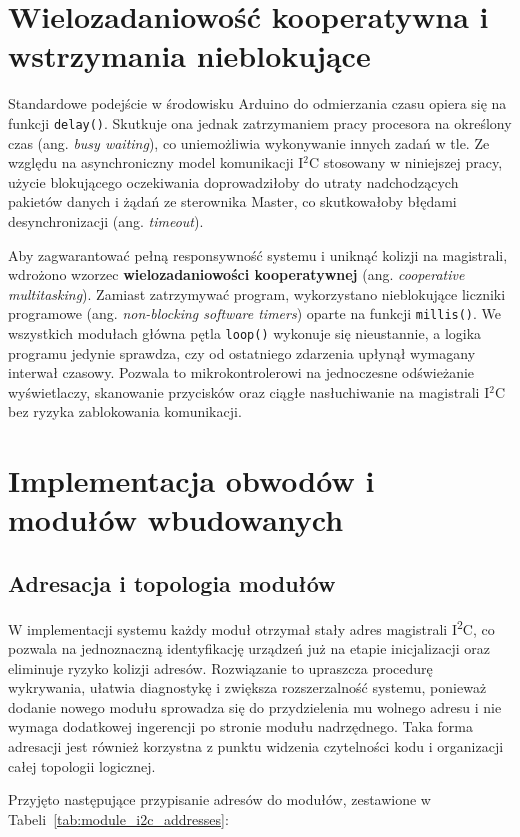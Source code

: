 \documentclass{SGGW-thesis}
\begin{document}
\section{Wielozadaniowość kooperatywna i wstrzymania nieblokujące}
Standardowe podejście w środowisku Arduino do odmierzania czasu opiera się na funkcji \texttt{delay()}. Skutkuje ona jednak zatrzymaniem pracy procesora na określony czas (ang. \textit{busy waiting}), co uniemożliwia wykonywanie innych zadań w tle. Ze względu na asynchroniczny model komunikacji I$^2$C stosowany w niniejszej pracy, użycie blokującego oczekiwania doprowadziłoby do utraty nadchodzących pakietów danych i żądań ze sterownika Master, co skutkowałoby błędami desynchronizacji (ang. \textit{timeout}).

Aby zagwarantować pełną responsywność systemu i uniknąć kolizji na magistrali, wdrożono wzorzec \textbf{wielozadaniowości kooperatywnej} (ang. \textit{cooperative multitasking}). Zamiast zatrzymywać program, wykorzystano nieblokujące liczniki programowe (ang. \textit{non-blocking software timers}) oparte na funkcji \texttt{millis()}. We wszystkich modułach główna pętla \texttt{loop()} wykonuje się nieustannie, a logika programu jedynie sprawdza, czy od ostatniego zdarzenia upłynął wymagany interwał czasowy. Pozwala to mikrokontrolerowi na jednoczesne odświeżanie wyświetlaczy, skanowanie przycisków oraz ciągłe nasłuchiwanie na magistrali I$^2$C bez ryzyka zablokowania komunikacji.

\section{Implementacja obwodów i modułów wbudowanych}
\subsection{Adresacja i topologia modułów}
W implementacji systemu każdy moduł otrzymał stały adres magistrali I\textsuperscript{2}C, co pozwala na jednoznaczną identyfikację urządzeń już na etapie inicjalizacji oraz eliminuje ryzyko kolizji adresów. Rozwiązanie to upraszcza procedurę wykrywania, ułatwia diagnostykę i zwiększa rozszerzalność systemu, ponieważ dodanie nowego modułu sprowadza się do przydzielenia mu wolnego adresu i nie wymaga dodatkowej ingerencji po stronie modułu nadrzędnego. Taka forma adresacji jest również korzystna z punktu widzenia czytelności kodu i organizacji całej topologii logicznej.

Przyjęto następujące przypisanie adresów do modułów, zestawione w Tabeli~\ref{tab:module_i2c_addresses}:
\end{document}
